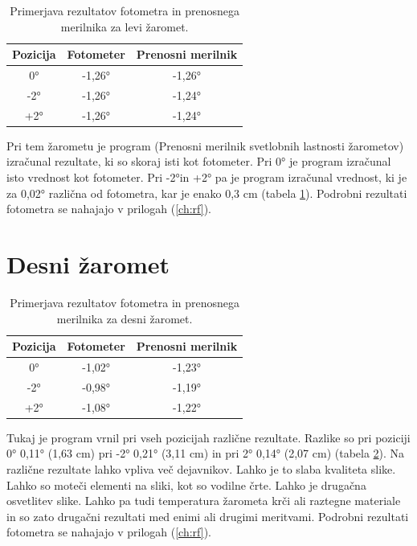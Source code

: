\documentclass[oneside, a4paper, 12pt]{book}
\begin{document}
\begin{table}
\begin{center}
\begin{tabular}{c|c|c}
\textbf{Pozicija} & \textbf{Fotometer} & \textbf{Prenosni merilnik} \\ \hline
0° & -1,26° & -1,26°  \\ \hline
-2°  & -1,26° & -1,24°   \\ \hline
+2°  & -1,26° & -1,24°   \\ 
\end{tabular}
\end{center}
\caption{Primerjava rezultatov fotometra in prenosnega merilnika za levi žaromet.}
\label{tbl:primerjava-levi}
\end{table}

Pri tem žarometu je program (Prenosni merilnik svetlobnih lastnosti žarometov) izračunal rezultate, ki so skoraj isti kot fotometer. Pri 0° je program izračunal isto vrednost kot fotometer. Pri -2°in +2° pa je program izračunal vrednost, ki je za 0,02° različna od fotometra, kar je enako 0,3 cm (tabela \ref{tbl:primerjava-levi}). Podrobni rezultati fotometra se nahajajo v prilogah (\ref{ch:rf}).

\section{Desni žaromet}

\begin{table}
\begin{center}
\begin{tabular}{c|c|c}
\textbf{Pozicija} & \textbf{Fotometer} & \textbf{Prenosni merilnik} \\ \hline
0° & -1,02° & -1,23°  \\ \hline
-2°  & -0,98° & -1,19°   \\ \hline
+2°  & -1,08° & -1,22°   \\ 
\end{tabular}
\end{center}
\caption{Primerjava rezultatov fotometra in prenosnega merilnika za desni žaromet.}
\label{tbl:primerjava-desni}
\end{table}

Tukaj je program vrnil pri vseh pozicijah različne rezultate. Razlike so pri poziciji 0° 0,11° (1,63 cm) pri -2° 0,21° (3,11 cm) in pri 2° 0,14° (2,07 cm) (tabela \ref{tbl:primerjava-desni}). Na različne rezultate lahko vpliva več dejavnikov. Lahko je to slaba kvaliteta slike. Lahko so moteči elementi na sliki, kot so vodilne črte. Lahko je drugačna osvetlitev slike. Lahko pa tudi temperatura žarometa krči ali raztegne materiale in so zato drugačni rezultati med enimi ali drugimi meritvami. Podrobni rezultati fotometra se nahajajo v prilogah (\ref{ch:rf}).
\end{document}
